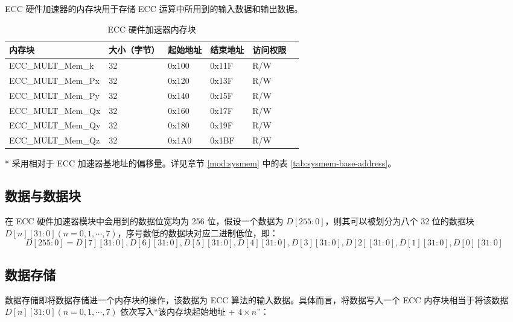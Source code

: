 \documentclass[main\_\_CN.tex]{subfiles}
\begin{document}
ECC 硬件加速器的内存块用于存储 ECC 运算中所用到的输入数据和输出数据。
\begin{table}[H]
    \centering
    \caption{ECC 硬件加速器内存块} \label{tab:ecc-memory}
    \begin{threeparttable}
    \begin{tabular}{ | l | l | l | l | l | l | }
    \hline
        \rowcolor{lightgray}
        \textbf{内存块} & \textbf{大小（字节）}  &  \textbf{起始地址}\tnote{*} &  \textbf{结束地址} \tnote{*} & \textbf{访问权限}   \\ \hline
        ECC\_MULT\_Mem\_k    & 32  & 0x100 & 0x11F & R/W \\ \hline
        ECC\_MULT\_Mem\_Px   & 32  & 0x120 & 0x13F & R/W \\ \hline
        ECC\_MULT\_Mem\_Py   & 32  & 0x140 & 0x15F & R/W \\ \hline
        ECC\_MULT\_Mem\_Qx   & 32  & 0x160 & 0x17F & R/W \\ \hline
        ECC\_MULT\_Mem\_Qy   & 32  & 0x180 & 0x19F & R/W \\ \hline
        ECC\_MULT\_Mem\_Qz   & 32  & 0x1A0 & 0x1BF & R/W \\ \hline
    \end{tabular}
    \begin{tablenotes}
        \item[*] 采用相对于 ECC 加速器基地址的偏移量。详见章节 \ref{mod:sysmem} \textit{} 中的表 \ref{tab:sysmem-base-address}。
    \end{tablenotes}
    \end{threeparttable}
\end{table}

\subsection{数据与数据块}

在 ECC 硬件加速器模块中会用到的数据位宽均为 256 位，假设一个数据为 $D[255:0]$，则其可以被划分为八个 32 位的数据块 $D[n][31:0](n=0,1,\cdots,7)$，序号数低的数据块对应二进制低位，即：
\[
D[255:0] = {D[7][31:0],D[6][31:0],D[5][31:0],
D[4][31:0],D[3][31:0],D[2][31:0],D[1][31:0],D[0][31:0]}
\]

\subsection{数据存储}

数据存储即将数据存储进一个内存块的操作，该数据为 ECC 算法的输入数据。具体而言，将数据写入一个 ECC 内存块相当于将该数据 $D[n][31:0] (n=0, 1, \cdots, 7)$ 依次写入“该内存块起始地址 + $4 \times n$”：
\end{document}
